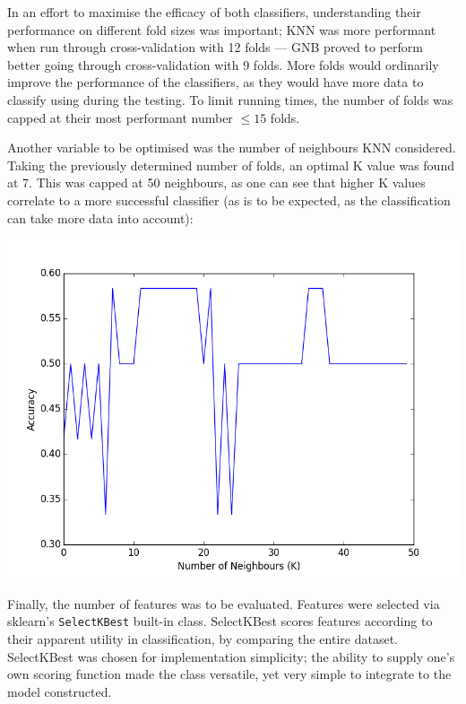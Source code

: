 \documentclass{tufte-handout}
\begin{document}
In an effort to maximise the efficacy of both classifiers, understanding their performance on different fold sizes was important; KNN was more performant when run through cross-validation with 12 folds --- GNB proved to perform better going through cross-validation with 9 folds. More folds would ordinarily improve the performance of the classifiers, as they would have more data to classify using during the testing. To limit running times, the number of folds was capped at their most performant number \(\le{}15\) folds.\par

Another variable to be optimised was the number of neighbours KNN considered. Taking the previously determined number of folds, an optimal K value was found at 7. This was capped at 50 neighbours, as one can see that higher K values correlate to a more successful classifier (as is to be expected, as the classification can take more data into account):

\includegraphics[width=\textwidth{},keepaspectratio]{optimal_k.png}

Finally, the number of features was to be evaluated. Features were selected via sklearn's \texttt{SelectKBest} built-in class. SelectKBest scores features according to their apparent utility in classification, by comparing the entire dataset. SelectKBest was chosen for implementation simplicity; the ability to supply one's own scoring function made the class versatile, yet very simple to integrate to the model constructed.\par
\end{document}
